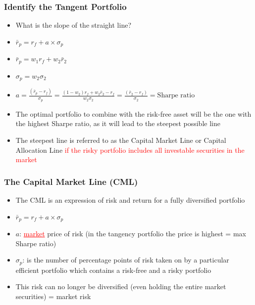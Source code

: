 \documentclass[9pt,aspectratio=169]{beamer}
\begin{document}

\begin{frame}

\frametitle{\textnormal{Identify the Tangent Portfolio}}

\begin{itemize}
    
\item What is the slope of the straight line?
\item $\bar{r}_p = r_f + a \times \sigma_p$
\item $\bar{r}_p = w_1 r_f + w_2 \bar{r}_2$
\item $ \sigma_p = w_2 \sigma_2$

\item $a= \frac{(\bar{r}_p - r_f)}{\sigma_p} = \frac {(1 - w_2)r_f + w_2 \bar{r}_2 -r_f}{w_2 \sigma_2} = \frac {(\bar{r}_2 - r_f)}{\sigma_2} = \text{Sharpe ratio}$  

\item The optimal portfolio to combine with the risk-free asset will be the one with the highest Sharpe ratio, as it will lead to the steepest possible line
\item The steepest line is referred to as the Capital Market Line or Capital Allocation Line \textcolor{red}{if the risky portfolio includes all investable securities in the  market} 
\end{itemize}

\end{frame}


\begin{frame}

\frametitle{\textnormal{The Capital Market Line (CML)}}

\begin{itemize}
    \item The CML is an expression of risk and return for a fully diversified portfolio
\item $\bar{r}_p = r_f + a \times \sigma_p$
\item $a$: \textcolor{red}{\underline{market}} price of risk (in the tangency portfolio the price is highest = max Sharpe ratio)
\item $\sigma_p$: is the number of percentage points of risk taken on by a particular efficient portfolio which contains a risk-free and a risky portfolio
\item This risk can no longer be diversified (even holding the entire market securities) = market risk

\end{itemize}

\end{frame}
\end{document}
